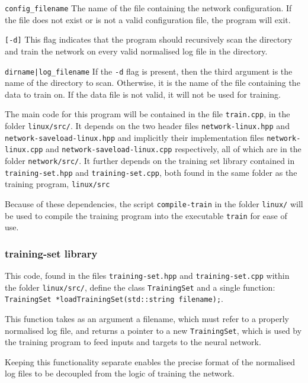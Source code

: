 \documentclass[a4paper]{article}
\begin{document}
\lstinline{config_filename} The name of the file containing the network configuration. If the file does not exist or is not a valid configuration file, the program will exit.

\lstinline{[-d]} This flag indicates that the program should recursively scan the directory and train the network on every valid normalised log file in the directory. 

\lstinline{dirname|log_filename} If the \lstinline{-d} flag is present, then the third argument is the name of the directory to scan. Otherwise, it is the name of the file containing the data to train on. If the data file is not valid, it will not be used for training.

The main code for this program will be contained in the file \lstinline{train.cpp}, in the folder \lstinline{linux/src/}. It depends on the two header files \lstinline{network-linux.hpp} and \lstinline{network-saveload-linux.hpp} and implicitly their implementation files \lstinline{network-linux.cpp} and \lstinline{network-saveload-linux.cpp} respectively, all of which are in the folder \lstinline{network/src/}. It further depends on the training set library contained in \lstinline{training-set.hpp} and \lstinline{training-set.cpp}, both found in the same folder as the training program, \lstinline{linux/src}


Because of these dependencies, the script \lstinline{compile-train} in the folder \lstinline{linux/} will be used to compile the training program into the executable \lstinline{train} for ease of use.

\subsubsection{training-set library}
\label{subsubsec:dc_csa_trainingset}

This code, found in the files \lstinline{training-set.hpp} and \lstinline{training-set.cpp} within the folder \lstinline{linux/src/}, define the class \lstinline{TrainingSet} and a single function: \lstinline{TrainingSet *loadTrainingSet(std::string filename);}.

This function takes as an argument a filename, which must refer to a properly normalised log file, and returns a pointer to a new \lstinline{TrainingSet}, which is used by the training program to feed inputs and targets to the neural network.

Keeping this functionality separate enables the precise format of the normalised log files to be decoupled from the logic of training the network.
\end{document}
